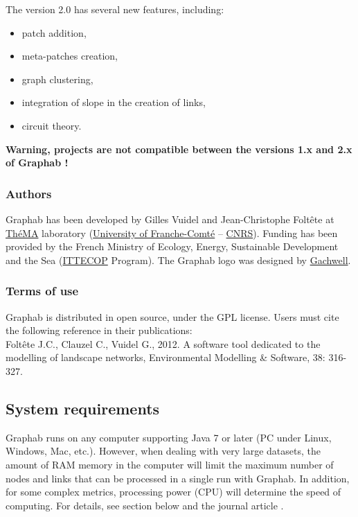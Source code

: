\documentclass{article}
\begin{document}
The version 2.0 has several new features, including:
\begin{itemize}
	\item patch addition,
	\item meta-patches creation,
	\item graph clustering,
	\item integration of slope in the creation of links,
	\item circuit theory.
\end{itemize}

\textbf{Warning, projects are not compatible between the versions 1.x and 2.x of Graphab !}

\subsubsection{Authors}

Graphab has been developed by Gilles Vuidel and Jean-Christophe Foltête at \href{http://thema.univ-fcomte.fr/}{ThéMA} laboratory (\href{http://www.univ-fcomte.fr}{University of Franche-Comté} – \href{http://www.cnrs.fr}{CNRS}). Funding has been provided by the French Ministry of Ecology, Energy, Sustainable Development and the Sea (\href{http://www.ittecop.fr/}{ITTECOP} Program). The Graphab logo was designed by \href{http://www.gachwell.com/}{Gachwell}.

\subsubsection{Terms of use}

Graphab is distributed in open source, under the GPL license. Users must cite the following reference \cite{2012_graphab_EMS} in their publications:\\
Foltête J.C., Clauzel C., Vuidel G., 2012. A software tool dedicated to the modelling of landscape networks, Environmental Modelling \& Software, 38: 316-327.


\subsection{System requirements}

Graphab runs on any computer supporting Java 7 or later (PC under Linux, Windows, Mac, etc.). However, when dealing with very large datasets, the amount of RAM memory in the computer will limit the maximum number of nodes and links that can be processed in a single run with Graphab. In addition, for some complex metrics, processing power (CPU) will determine the speed of computing. For details, see section  below and the journal article  \cite{2012_graphab_EMS}.
\end{document}
